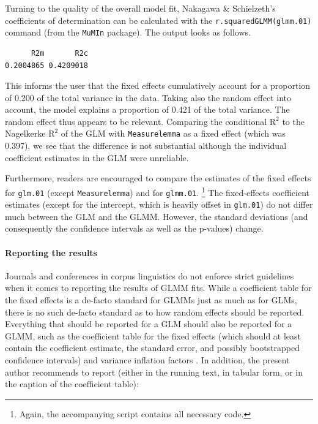 Turning to the quality of the overall model fit, Nakagawa \& Schielzeth's coefficients of determination can be calculated with the \texttt{r.squaredGLMM(glmm.01)} command (from the \texttt{MuMIn} package).
The output looks as follows.

\vspace{0.5\baselineskip}

\begin{lstlisting}
      R2m       R2c
0.2004865 0.4209018
\end{lstlisting}

This informs the user that the fixed effects cumulatively account for a proportion of 0.200 of the total variance in the data.
Taking also the random effect into account, the model explains a proportion of 0.421 of the total variance.
The random effect thus appears to be relevant.
Comparing the conditional $\textrm{R}^{\textrm{2}}$ to the Nagelkerke $\textrm{R}^{\textrm{2}}$ of the GLM with \texttt{Measurelemma} as a fixed effect (which was 0.397), we see that the difference is not substantial although the individual coefficient estimates in the GLM were unreliable.

Furthermore, readers are encouraged to compare the estimates of the fixed effects for \texttt{glm.01} (except \texttt{Measurelemma}) and for \texttt{glmm.01}.%
\footnote{Again, the accompanying script contains all necessary code.}
The fixed-effects coefficient estimates (except for the intercept, which is heavily offset in \texttt{glm.01}) do not differ much between the GLM and the GLMM.
However, the standard deviations (and consequently the confidence intervals as well as the p-values) change.

\paragraph{Reporting the results}

Journals and conferences in corpus linguistics do not enforce strict guidelines when it comes to reporting the results of GLMM fits.
While a coefficient table for the fixed effects is a de-facto standard for GLMMs just as much as for GLMs, there is no such de-facto standard as to how random effects should be reported.
Everything that should be reported for a GLM should also be reported for a GLMM, such as the coefficient table for the fixed effects (which should at least contain the coefficient estimate, the standard error, and possibly bootstrapped confidence intervals) and variance inflation factors \citep{FoxMonette1992,ZuurEa2010}.
In addition, the present author recommends to report (either in the running text, in tabular form, or in the caption of the coefficient table):

